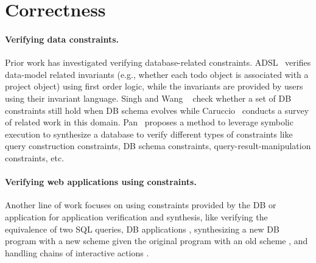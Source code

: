 \section{Correctness}
\label{sec:con-rel}


\paragraph{\bf Verifying data constraints.} Prior work has investigated verifying    database-related constraints.  ADSL~\cite{bocic2019inductive} verifies data-model related invariants (e.g., whether each todo object is associated with a project object) using first order logic, while the invariants are provided by users using their invariant language. Singh and Wang ~\cite{singh2017generating, wang2019synthesizing} check whether a set of DB constraints still hold when DB schema evolves while Caruccio~\cite{caruccio2016synchronization} conducts a survey of related work in this domain. Pan~\cite{pan2014guided} proposes a method to leverage symbolic execution to synthesize a database to verify different types of constraints like query construction constraints, DB schema constraints, query-result-manipulation constraints, etc.


\paragraph{\bf Verifying web applications using constraints.} Another line of work focuses on using constraints provided by the DB or application for application verification
and synthesis, like verifying the equivalence of two SQL queries\cite{cosettePLDI, cosetteOOPSLA, cosetteCIDR}, DB applications
\cite{wang2018verifyequal}, synthesizing a new DB program with a new scheme
given the original program with an old scheme \cite{wang2019synthesizing},
and handling chains of interactive actions \cite{deutsch2005verifier}. 

